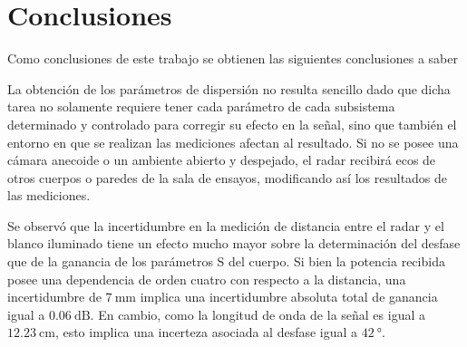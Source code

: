 \chapter{Conclusiones} \label{ch:conclusions}

\ifpdf
    \graphicspath{{Chapter6/Figs/Raster/}{Chapter6/Figs/PDF/}{Chapter6/Figs/}}
\else
    \graphicspath{{Chapter6/Figs/Vector/}{Chapter6/Figs/}}
\fi


Como conclusiones de este trabajo se obtienen las siguientes conclusiones a saber

La obtención de los parámetros de dispersión no resulta sencillo dado que dicha tarea no solamente requiere tener cada parámetro de cada subsistema determinado y controlado para corregir su efecto en la señal, sino que también el entorno en que se realizan las mediciones afectan al resultado. Si no se posee una cámara anecoide o un ambiente abierto y despejado, el radar recibirá ecos de otros cuerpos o paredes de la sala de ensayos, modificando así los resultados de las mediciones.

Se observó que la incertidumbre en la medición de distancia entre el radar y el blanco iluminado tiene un efecto mucho mayor sobre la determinación del desfase que de la ganancia de los parámetros S del cuerpo. Si bien la potencia recibida posee una dependencia de orden cuatro con respecto a la distancia, una incertidumbre de $\SI{7}{\milli\meter}$ implica una incertidumbre absoluta total de ganancia igual a $\SI{0.06}{\dB}$. En cambio, como la longitud de onda de la señal es igual a $\SI{12.23}{\centi\meter}$, esto implica una incerteza asociada al desfase igual a $\SI{42}{\degree}$.

